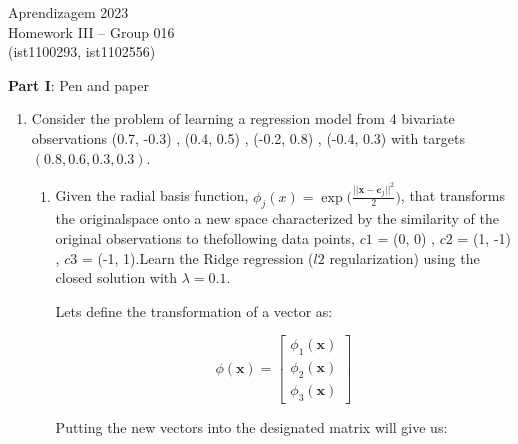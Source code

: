 \documentclass[12pt]{article}
\begin{document}
\newcommand{\prob}{\textrm{P}}
\newcommand{\ind}{\perp\!\!\!\!\!\perp} 
\newcommand{\notind}{\not\perp\!\!\!\!\!\perp}
\newcommand{\defeq}{\vcentcolon=}

\center
Aprendizagem 2023\\
Homework III -- Group 016\\
(ist1100293, ist1102556)\vskip 1cm

\large{\textbf{Part I}: Pen and paper}\normalsize

\begin{enumerate}[leftmargin=\labelsep]
    \item Consider the problem of learning a regression model from 4 bivariate observations {(0.7, -0.3) , (0.4, 0.5) , (-0.2, 0.8) , (-0.4, 0.3)} with targets $(0.8, 0.6, 0.3, 0.3)$.

    \begin{enumerate}
        \item Given the radial basis function, $\phi_j(x)=\exp\bigl( \frac{||\mathbf{x}-\mathbf{c}_j||^2}{2} \bigr)$, that transforms the originalspace onto a new space characterized by the similarity of the original observations to thefollowing data points, {$c1$ = (0, 0) , $c2$ = (1, -1) , $c3$ = (-1, 1)}.Learn the Ridge regression ($l2$ regularization) using the closed solution with $\lambda = 0.1$.
    
        Lets define the transformation of a vector as:

        \begin{equation}
            \phi(\mathbf{x}) = \begin{bmatrix}
                \phi_1(\mathbf{x}) \\
                \phi_2(\mathbf{x}) \\
                \phi_3(\mathbf{x})
            \end{bmatrix}
        \end{equation}

        Putting the new vectors into the designated matrix will give us:


\end{enumerate}
\end{enumerate}
\end{document}
